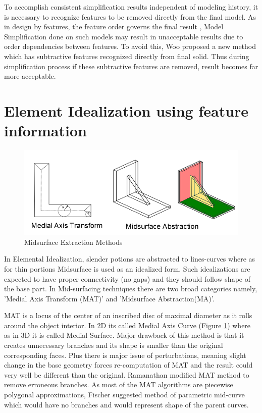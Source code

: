 	To accomplish consistent simplification results independent of modeling history, it is necessary to recognize features to be removed directly from the final model.  As in design by features, the feature order governs the final result \cite{Russ2012}, Model Simplification done on such models may result in unacceptable results due to order dependencies between features. To avoid this, Woo \cite{Woo2009} proposed a new method which has subtractive features recognized directly from final solid. Thus during simplification process if these subtractive features are removed, result becomes far more acceptable.

\section{Element Idealization using feature information}

	\begin{figure}[h]
	\centering
	\includegraphics[width=0.9\linewidth]{..//Common/images//MAT_Midsurf.png}
	\caption{Midsurface Extraction Methods}
	\label{MATMidsurf}
	\end{figure}
	
	

In Elemental Idealization, slender potions are abstracted to lines-curves where as for thin portions Midsurface is used as an idealized form. Such idealizations are expected to have proper connectivity  (no gaps) and they should follow shape of the base part. In Mid-surfacing techniques there are two broad categories namely, 'Medial Axis Transform (MAT)' and 'Midsurface Abstraction(MA)'.

MAT is a locus of the center of an inscribed disc of maximal diameter as it rolls around the object interior.  In 2D its called Medial Axis Curve (Figure \ref{MATMidsurf}) where as in 3D it is called Medial Surface. Major drawback of this method is that it creates unnecessary branches and its shape is smaller than the original corresponding faces. Plus there is major issue of perturbations, meaning slight change in the base geometry forces re-computation of MAT and the result could very well be different than the original.  Ramanathan \cite{Ramanathan2004} modified MAT method to remove erroneous branches. As most of the MAT algorithms are piecewise polygonal approximations, Fischer \cite{Elber1999} suggested method of parametric mid-curve which would have no branches and would represent shape of the parent curves.

